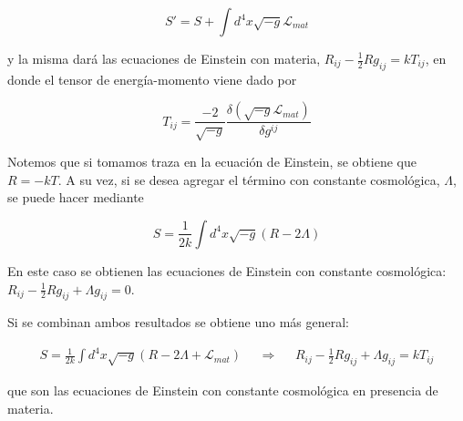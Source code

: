 \begin{equation*}
	S'=S+\int d^4x\sqrt{-g}\mathcal{L}_{mat}
\end{equation*}

y la misma dará las ecuaciones de Einstein con materia, $R_{ij}-\frac{1}{2}Rg_{ij}=kT_{ij}$, en donde el tensor de energía-momento viene dado por

\begin{equation*}
	T_{ij}=\frac{-2}{\sqrt{-g}}\frac{\delta (\sqrt{-g}\mathcal{L}_{mat})}{\delta g^{ij}}
\end{equation*}

Notemos que si tomamos traza en la ecuación de Einstein, se obtiene que $R=-kT$. A su vez, si se desea agregar el término con constante cosmológica, $\Lambda$, se puede hacer mediante

\begin{equation*}
	S=\frac{1}{2k}\int d^4x\sqrt{-g}(R-2\Lambda)
\end{equation*}

En este caso se obtienen las ecuaciones de Einstein con constante cosmológica: $R_{ij}-\frac{1}{2}Rg_{ij}+\Lambda g_{ij}=0$.

Si se combinan ambos resultados se obtiene uno más general:

\begin{align*}
    	S=\frac{1}{2k}\int d^4x\sqrt{-g}(R-2\Lambda+\mathcal{L}_{mat})& &\Longrightarrow& & R_{ij}-\frac{1}{2}Rg_{ij}+\Lambda g_{ij}=kT_{ij}
\end{align*}

que son las ecuaciones de Einstein con constante cosmológica en presencia de materia.


